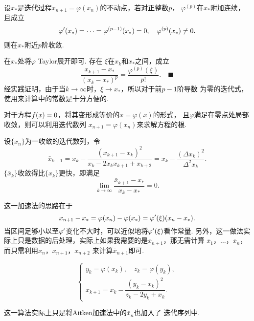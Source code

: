   \begin{thm}[$p$阶收敛条件]
    \label{thm: p阶收敛条件}
    设$x_*$是迭代过程$x_{n+1}=\varphi(x_n)$的不动点，若对正整数$p$，
    $\varphi^{(p)}$在$x_*$附加连续，且成立
    \[\begin{split}
      \varphi^\prime(x_*) = \cdots = \varphi^{(p-1)}(x_*) = 0,\quad
      \varphi^{(p)}(x_*) \ne 0.
    \end{split}\]
    则在$x_*$附近$p$阶收敛.
  \end{thm}
  \proof
    在$x_*$处将$\varphi$ Taylor展开即可. 存在
    $\xi$在$x_k$和$x_*$之间，成立
    \begin{equation}
      \label{equ: 导数为零情况余项}
      \frac{x_{k+1}-x_*}{(x_k-x_*)^p} = \frac{\varphi^{(p)}(\xi)}{p!}.
      \quad\blacksquare
    \end{equation}
  \remark
    经实践证明，由于当$k\to\infty$时，$\xi\to x_*$，所以对于前$p-1$阶导数
    为零的迭代式，使用来计算中的常数是十分方便的.


  \begin{alg}[不动点法]
    对于方程$\mathnormal{f}(x) = 0$，将其变形成等价的$x=\varphi(x)$的形式，
    且$\varphi$满足在零点处局部收敛，则可以利用迭代数列
    $x_{n+1} = \varphi(x_n)$来求解方程的根.
  \end{alg}

  \begin{alg}
    设$\{x_n\}$为一收敛的迭代数列，令
    \[
      \bar{x}_{k+1} = x_k - \frac{(x_{k+1}-x_k)^2}{x_k-2x_kx_{k+1}+x_{k+2}}
      = x_k - \frac{(\Delta x_k)^2}{\Delta^2x_k}.
    \]
    $\{\bar{x}_k\}$收敛得比$\{x_k\}$更快，即满足
    \[
      \lim_{k\to\infty}\frac{\bar{x}_{k+1}-x_*}{x_k-x_*} = 0.
    \]
  \end{alg}
  \remark
    这一加速法的思路在于
    \[
      x_{n+1}-x_* = \varphi(x_n) - \varphi(x_*) = \varphi^\prime(\xi)(x_n-x_*).
    \]
    当区间足够小以至$\varphi^\prime$变化不大时，可以近似地将$\varphi^\prime(\xi)$看作常量.
    另外，这一做法实际上只是数据的后处理，实际上如果我需要的是$\bar{x}_{n+1}$，那无需计算
    $\bar{x}_1$，$\dots$，$\bar{x}_n$，而只需利用$x_{n}$，$x_{n+1}$，$x_{n+2}$
    来计算$\bar{x}_{n+1}$即可.

  \begin{alg}[Steffensen迭代法]
    \[\begin{cases}
      y_k = \varphi(x_k),\quad z_k = \varphi(y_k), \\
      x_{k+1} = x_k - \dfrac{(y_k-x_k)^2}{z_k-2y_k+x_k}.
    \end{cases}\]
  \end{alg}
  \remark
    这一算法实际上只是将Aitken加速法中的$\bar{x}_n$也加入了
    迭代序列中.

